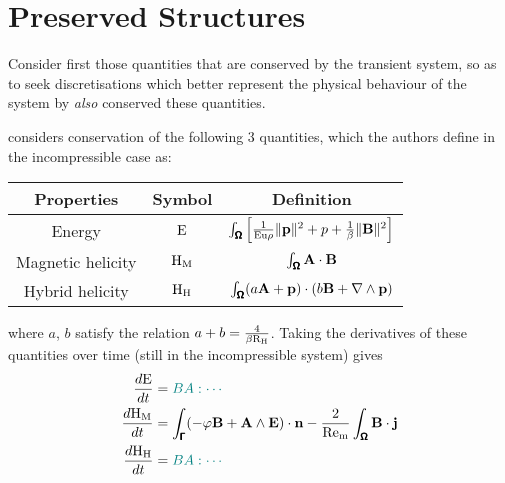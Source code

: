 \section{Preserved Structures}
    
    Consider first those quantities that are conserved by the transient system, so as to seek discretisations which better represent the physical behaviour of the system by \emph{also} conserved these quantities. 
    
    \cite{LHF22} considers conservation of the following 3 quantities, which the authors define in the incompressible case as: 
    \begin{center}\begin{tabular}{ c c c }
        Properties  &  Symbol  &  Definition  \\
        \hline\hline
        Energy  &  $\mathrm{E}$  &  $\int_{\pmb{\mathsf{\Omega}}}\left[\frac{1}{\mathrm{Eu}\rho}\|\mathbf{p}\|^{2} + p + \frac{1}{\beta}\|\mathbf{B}\|^{2}\right]$  \\
        Magnetic helicity  &  $\mathrm{H}_{\mathrm{M}}$  &  $\int_{\pmb{\mathsf{\Omega}}}\mathbf{A}\cdot\mathbf{B}$  \\
        Hybrid helicity  &  $\mathrm{H}_{\mathrm{H}}$  &  $\int_{\pmb{\mathsf{\Omega}}}(a\mathbf{A} + \mathbf{p})\cdot(b\mathbf{B} + \nabla\wedge\mathbf{p})$
    \end{tabular}\end{center}
    where $a$, $b$ satisfy the relation $a + b  =  \frac{4}{\beta\mathrm{R}_{\mathrm{H}}}$.  Taking the derivatives of these quantities over time (still in the incompressible system) gives
    \begin{align}
        \frac{d\mathrm{E}}{dt}  &=  \textcolor{teal}{BA: \cdots}  \\
        \frac{d\mathrm{H}_{\mathrm{M}}}{dt}  &=  \int_{\pmb{\mathsf{\Gamma}}}(- \varphi\mathbf{B} + \mathbf{A}\wedge\mathbf{E})\cdot\mathbf{n} - \frac{2}{\mathrm{Re}_{\mathrm{m}}}\int_{\pmb{\mathsf{\Omega}}}\mathbf{B}\cdot\mathbf{j}  \\
        \frac{d\mathrm{H}_{\mathrm{H}}}{dt}  &=  \textcolor{teal}{BA: \cdots} \\
    \end{align}

    